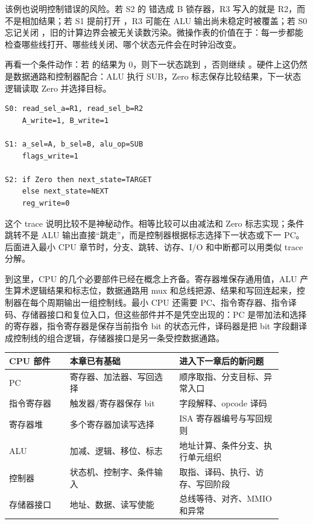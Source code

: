 该例也说明控制错误的风险。若 S2 的  错选成 B 锁存器，R3 写入的就是 R2，而不是相加结果；若 S1 提前打开 ，R3 可能在 ALU 输出尚未稳定时被覆盖；若 S0 忘记关闭 ，旧的计算边界会被无关读数污染。微操作表的价值在于：每一步都能检查哪些线打开、哪些线关闭、哪个状态元件会在时钟沿改变。

再看一个条件动作：若  的结果为 0，则下一状态跳到 ，否则继续 。硬件上这仍然是数据通路和控制器配合：ALU 执行 SUB，Zero 标志保存比较结果，下一状态逻辑读取 Zero 并选择目标。

\begin{lstlisting}
S0: read_sel_a=R1, read_sel_b=R2
    A_write=1, B_write=1

S1: a_sel=A, b_sel=B, alu_op=SUB
    flags_write=1

S2: if Zero then next_state=TARGET
    else next_state=NEXT
    reg_write=0
\end{lstlisting}

这个 trace 说明比较不是神秘动作。相等比较可以由减法和 Zero 标志实现；条件跳转不是 ALU 输出直接“跳走”，而是控制器根据标志选择下一状态或下一 PC。后面进入最小 CPU 章节时，分支、跳转、访存、I/O 和中断都可以用类似 trace 分解。


到这里，CPU 的几个必要部件已经在概念上齐备。寄存器堆保存通用值，ALU 产生算术逻辑结果和标志位，数据通路用 mux 和总线把源、结果和写回连起来，控制器在每个周期输出一组控制线。最小 CPU 还需要 PC、指令寄存器、指令译码、存储器接口和复位入口，但这些部件并不是凭空出现的：PC 是带加法和选择的寄存器，指令寄存器是保存当前指令 bit 的状态元件，译码器是把 bit 字段翻译成控制线的组合逻辑，存储器接口是另一条受控数据通路。

\begin{longtable}{L{0.2\linewidth}L{0.36\linewidth}L{0.34\linewidth}}
\toprule
CPU 部件 & 本章已有基础 & 进入下一章后的新问题 \\
\midrule
PC & 寄存器、加法器、写回选择 & 顺序取指、分支目标、异常入口 \\
指令寄存器 & 触发器/寄存器保存 bit & 字段解释、opcode 译码 \\
寄存器堆 & 多个寄存器加读写选择 & ISA 寄存器编号与写回规则 \\
ALU & 加减、逻辑、移位、标志 & 地址计算、条件分支、执行单元组织 \\
控制器 & 状态机、控制字、条件输入 & 取指、译码、执行、访存、写回阶段 \\
存储器接口 & 地址、数据、读写使能 & 总线等待、对齐、MMIO 和异常 \\
\bottomrule
\end{longtable}

